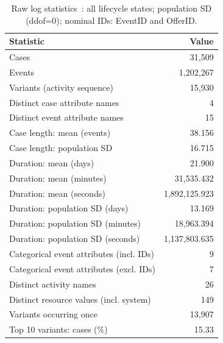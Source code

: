 
\begin{table}[htbp]
\centering
\small
\caption{Raw log statistics~\cite{vanDongen2017BPIC}: all lifecycle states; population SD (ddof=0); nominal IDs: EventID and OfferID.}
\label{tab:raw-log-statistics}
\begin{tabular}{@{}lr@{}}
\toprule
Statistic & Value \\
\midrule
Cases & 31,509 \\
Events & 1,202,267 \\
Variants (activity sequence) & 15,930 \\
Distinct case attribute names & 4 \\
Distinct event attribute names & 15 \\
Case length: mean (events) & 38.156 \\
Case length: population SD & 16.715 \\
Duration: mean (days) & 21.900 \\
Duration: mean (minutes) & 31,535.432 \\
Duration: mean (seconds) & 1,892,125.923 \\
Duration: population SD (days) & 13.169 \\
Duration: population SD (minutes) & 18,963.394 \\
Duration: population SD (seconds) & 1,137,803.635 \\
Categorical event attributes (incl. IDs) & 9 \\
Categorical event attributes (excl. IDs) & 7 \\
Distinct activity names & 26 \\
Distinct resource values (incl. system) & 149 \\
Variants occurring once & 13,907 \\
Top 10 variants: cases (\%) & 15.33 \\
\bottomrule
\end{tabular}
\end{table}
